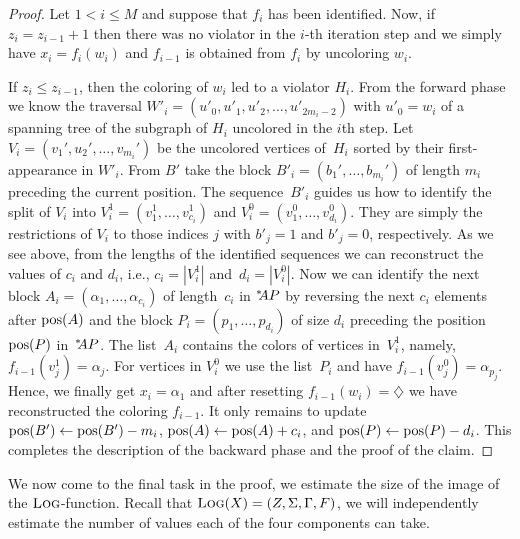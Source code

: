 \documentclass[11pt]{article}
\begin{document}
\begin{proof}
  Let $1<i\leq M$ and suppose that $f_i$ has been identified.
  Now, if $z_{i} = z_{i-1} +1$ then 
  there was no violator in the $i$-th iteration step and we simply have 
  $x_i = f_i(w_i)$ and $f_{i-1}$ is obtained from $f_i$ by uncoloring $w_i$.
  

  If $z_i \leq z_{i-1}$, then the coloring of $w_i$ led to a violator
  $H_i$.  From the forward phase we know the traversal
  $W'_i=(u'_0,u'_1,u'_2,\ldots,u'_{2m_i-2})$ with $u'_0=w_i$ of a
  spanning tree of the subgraph of $H_i$ uncolored in the $i$th
  step. Let $V_i=(v_1',u_2',\ldots,v_{m_i}')$ be the uncolored vertices of~$H_i$
  sorted by their first-appearance in $W'_i$.  From $B'$ take the
  block $B'_i=(b_1',\ldots,b_{m_i}')$ of length $m_i$ preceding the
  current position.  The sequence~$B'_i$ guides us how to identify the
  split of $V_i$ into $V_i^{1} = (v^1_1,\ldots,v^1_{c_i})$ and
  $V_i^{0} = (v^0_1,\ldots,v^0_{d_i})$.  They are simply the
  restrictions of $V_i$ to those indices $j$ with $b'_j=1$ and
  $b'_j=0$, respectively.  As we see above, from the lengths of the
  identified sequences we can reconstruct the values of $c_i$ and
  $d_i$, i.e., $c_i=|V_i^1|$ and~$d_i=|V_i^0|$.  Now we can identify
  the next block $A_i= (\alpha_1,\ldots,\alpha_{c_i})$ of length~$c_i$
  in ${}^{*}\kern-3pt AP$ by reversing the next $c_i$ elements after $\text{\rmfamily pos}(A)$ and
  the block $P_i=(p_1,\ldots,p_{d_i})$ of size $d_i$ preceding the
  position $\text{\rmfamily pos}(P)$ in~${}^{*}\kern-3pt AP$.  The list~$A_i$ contains the colors of
  vertices in~$V^1_i$, namely, $f_{i-1}(v^1_j) = \alpha_j$.  For
  vertices in $V_i^{0}$ we use the list~$P_i$ and have
  $f_{i-1}(v^0_j) = \alpha_{p_{j}}$.  Hence, we finally get
  $x_i=\alpha_1$ and after resetting $f_{i-1}(w_i)=\diamondsuit$ we have
  reconstructed the coloring $f_{i-1}$.  It only remains to update
  $\text{\rmfamily pos}(B') \gets \text{\rmfamily pos}(B')-m_i$, $\text{\rmfamily pos}(A) \gets \text{\rmfamily pos}(A)+c_i$, and
  $\text{\rmfamily pos}(P) \gets \text{\rmfamily pos}(P)-d_i$.  This completes the description of the
  backward phase and the proof of the claim.
\end{proof}

We now come to the final task in the proof, we estimate the
size of the image of the $\text{\scshape Log}$-function.
Recall that $\text{\scshape Log}(X) = (Z,\Sigma,\Gamma,F)$, we will independently
estimate the number of values each of the four components can take.
\end{document}
